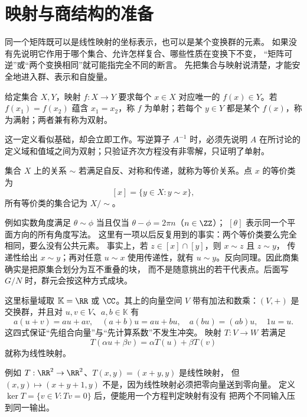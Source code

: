 \section{映射与商结构的准备}
同一个矩阵既可以是线性映射的坐标表示，也可以是某个变换群的元素。
如果没有先说明它作用于哪个集合、允许怎样复合、哪些性质在变换下不变，
“矩阵可逆”或“两个变换相同”就可能指完全不同的断言。
先把集合与映射说清楚，才能安全地进入群、表示和自旋量。

\begin{definition}[映射、单射、满射与双射]
给定集合 \(X,Y\)，映射 \(f:X\to Y\) 要求每个 \(x\in X\) 对应唯一的 \(f(x)\in Y\)。若 \(f(x_1)=f(x_2)\) 蕴含 \(x_1=x_2\)，称 \(f\) 为单射；若每个 \(y\in Y\) 都是某个 \(f(x)\)，称为满射；两者兼有称为双射。
\end{definition}

这一定义看似基础，却会立即工作。写逆算子 \(A^{-1}\) 时，必须先说明 \(A\) 在所讨论的定义域和值域之间为双射；只验证齐次方程没有非零解，只证明了单射。

\begin{definition}[等价关系与商集]
集合 \(X\) 上的关系 \(\sim\) 若满足自反、对称和传递，就称为等价关系。点 \(x\) 的等价类为
\[
[x]=\{y\in X:y\sim x\},
\]
所有等价类的集合记为 \(X/{\sim}\)。
\end{definition}

例如实数角度满足 \(\theta\sim\phi\) 当且仅当
\(\theta-\phi=2\pi n\)（\(n\in\ZZ\)）；
\([\theta]\) 表示同一个平面方向的所有角度写法。
这里有一项以后反复用到的事实：两个等价类要么完全相同，要么没有公共元素。
事实上，若 \(z\in[x]\cap[y]\)，则 \(x\sim z\) 且 \(z\sim y\)，
传递性给出 \(x\sim y\)；再对任意 \(u\sim x\) 使用传递性，就有
\(u\sim y\)。反向同理。因此商集确实是把原集合划分为互不重叠的块，
而不是随意挑出的若干代表点。后面写 \(G/N\) 时，群元会按这种方式成块。

\begin{definition}[向量空间与线性映射]
这里标量域取 \(\mathbb K=\RR\) 或 \(\CC\)。其上的向量空间
\(V\) 带有加法和数乘：\((V,+)\) 是交换群，并且对
\(u,v\in V\)、\(a,b\in\mathbb K\) 有
\[
a(u+v)=au+av,\quad (a+b)u=au+bu,\quad
a(bu)=(ab)u,\quad 1u=u.
\]
这四式保证“先组合向量”与“先计算系数”不发生冲突。
映射 \(T:V\to W\) 若满足
\[
T(\alpha u+\beta v)=\alpha T(u)+\beta T(v)
\]
就称为线性映射。
\end{definition}

例如 \(T:\RR^2\to\RR^2\)、\(T(x,y)=(x+y,y)\) 是线性映射，
但 \((x,y)\mapsto(x+y+1,y)\) 不是，因为线性映射必须把零向量送到零向量。
定义 \(\ker T=\{v\in V:Tv=0\}\) 后，便能用一个方程判定映射有没有
把两个不同输入压到同一输出。

